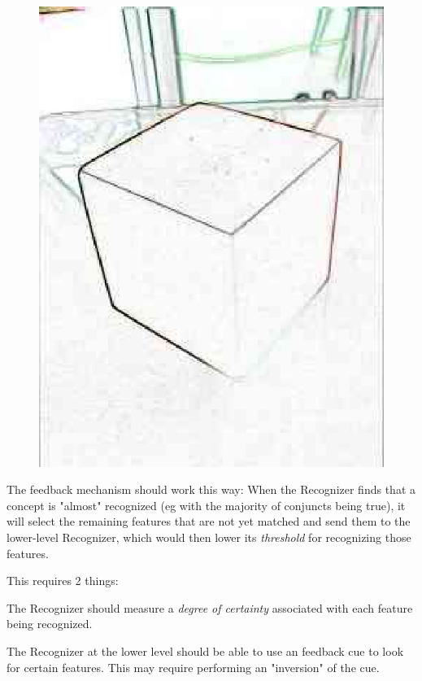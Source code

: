 \begin{figure}[H]
\centering
\includegraphics[scale=0.8, bb=0 0 240 320]{CubeMissingEdge.eps}
\end{figure}

The feedback mechanism should work this way: When the Recognizer finds that a concept is "almost" recognized (eg with the majority of conjuncts being true), it will select the remaining features that are not yet matched and send them to the lower-level Recognizer, which would then lower its \emph{threshold} for recognizing those features.

This requires 2 things:
\begin{compactenum}
	\item The Recognizer  should measure a \emph{degree of certainty} associated with each feature being recognized.
	\item  The Recognizer  at the lower level should be able to use an feedback cue to look for certain features. This may require performing an "inversion" of the cue.
\end{compactenum}

